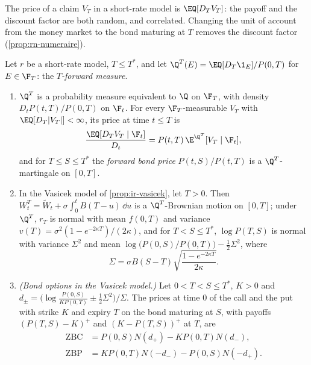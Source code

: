 The price of a claim $V_T$ in a short-rate model is $\EQ[D_TV_T]$: the payoff and the discount
factor are both random, and correlated. Changing the unit of account from the money market to the
bond maturing at $T$ removes the discount factor (\cref{prop:rn-numeraire}).

\begin{proposition}\label{prop:ir-forward-measure}
Let $r$ be a short-rate model, $T\le T^*$, and let $\Q^T(E)=\EQ[D_T\1_E]/P(0,T)$ for $E\in\F_T$: the
\emph{$T$-forward measure}.
\begin{enumerate}[label=(\roman*)]
  \item $\Q^T$ is a probability measure equivalent to $\Q$ on $\F_T$, with density
    $D_tP(t,T)/P(0,T)$ on $\F_t$. For every $\F_T$-measurable $V_T$ with $\EQ[D_T|V_T|]<\infty$, its
    price at time $t\le T$ is
    \[
      \frac{\EQ[D_TV_T\mid\F_t]}{D_t}=P(t,T)\,\E^{\Q^T}[V_T\mid\F_t],
    \]
    and for $T\le S\le T^*$ the \emph{forward bond price} $P(t,S)/P(t,T)$ is a $\Q^T$-martingale on $[0,T]$.
  \item In the Vasicek model of \cref{prop:ir-vasicek}, let $T>0$. Then
    $W^T_t=\widetilde W_t+\sigma\int_0^tB(T-u)\,\dd u$ is a $\Q^T$-Brownian motion on $[0,T]$; under $\Q^T$,
    $r_T$ is normal with mean $f(0,T)$ and variance $v(T)=\sigma^2(1-e^{-2\kappa T})/(2\kappa)$, and for
    $T<S\le T^*$, $\log P(T,S)$ is normal with
    variance $\Sigma^2$ and mean $\log\big(P(0,S)/P(0,T)\big)-\frac12\Sigma^2$, where
    \[
      \Sigma=\sigma B(S-T)\sqrt{\frac{1-e^{-2\kappa T}}{2\kappa}} .
    \]
  \item \emph{(Bond options in the Vasicek model.)} Let $0<T<S\le T^*$, $K>0$ and
    $d_\pm=\big(\log\frac{P(0,S)}{KP(0,T)}\pm\frac12\Sigma^2\big)/\Sigma$. The prices at time $0$ of the
    call and the put with strike $K$ and expiry $T$ on the bond maturing at $S$, with payoffs
    $(P(T,S)-K)^+$ and $(K-P(T,S))^+$ at $T$, are
    \begin{align*}
      \mathrm{ZBC}&=P(0,S)N(d_+)-KP(0,T)N(d_-),\\
      \mathrm{ZBP}&=KP(0,T)N(-d_-)-P(0,S)N(-d_+).
    \end{align*}
\end{enumerate}
\end{proposition}

